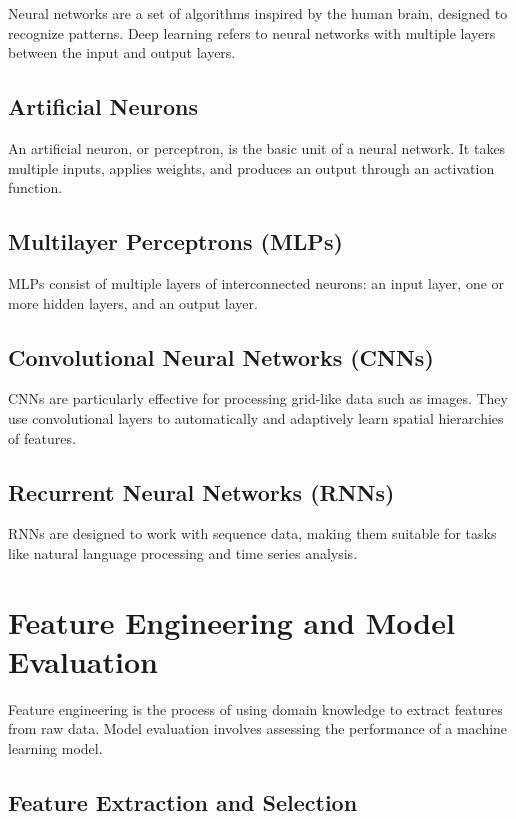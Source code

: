 Neural networks are a set of algorithms inspired by the human brain,
designed to recognize patterns. Deep learning refers to neural networks
with multiple layers between the input and output layers.

\subsection{Artificial Neurons}

An artificial neuron, or perceptron, is the basic unit of a neural
network. It takes multiple inputs, applies weights, and produces an
output through an activation function.

\subsection{Multilayer Perceptrons (MLPs)}

MLPs consist of multiple layers of interconnected neurons: an input
layer, one or more hidden layers, and an output layer.

\subsection{Convolutional Neural Networks (CNNs)}

CNNs are particularly effective for processing grid-like data such as
images. They use convolutional layers to automatically and adaptively
learn spatial hierarchies of features.

\subsection{Recurrent Neural Networks (RNNs)}

RNNs are designed to work with sequence data, making them suitable for
tasks like natural language processing and time series analysis.

\section{Feature Engineering and Model Evaluation}

Feature engineering is the process of using domain knowledge to extract
features from raw data. Model evaluation involves assessing the
performance of a machine learning model.

\subsection{Feature Extraction and Selection}

